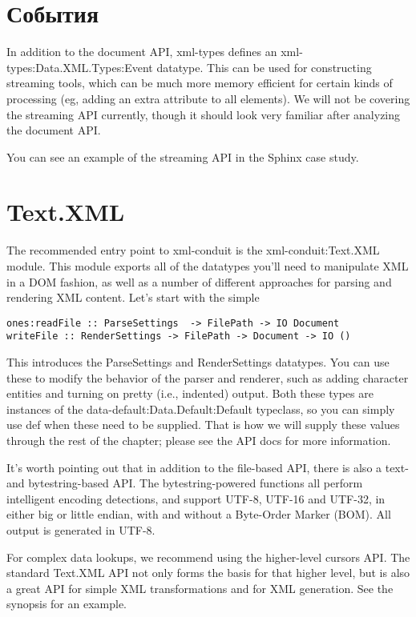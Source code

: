 \section{События} %

In addition to the document API, xml-types defines an xml-types:Data.XML.Types:Event datatype. This can be used for constructing streaming tools, which can be much more memory efficient for certain kinds of processing (eg, adding an extra attribute to all elements). We will not be covering the streaming API currently, though it should look very familiar after analyzing the document API.

\begin{remark}
You can see an example of the streaming API in the Sphinx case study.
\end{remark}

\section{Text.XML}

The recommended entry point to xml-conduit is the xml-conduit:Text.XML module. This module exports all of the datatypes you'll need to manipulate XML in a DOM fashion, as well as a number of different approaches for parsing and rendering XML content. Let's start with the simple

\begin{lstlisting}
ones:readFile :: ParseSettings  -> FilePath -> IO Document
writeFile :: RenderSettings -> FilePath -> Document -> IO ()
\end{lstlisting}

This introduces the ParseSettings and RenderSettings datatypes. You can use these to modify the behavior of the parser and renderer, such as adding character entities and turning on pretty (i.e., indented) output. Both these types are instances of the data-default:Data.Default:Default typeclass, so you can simply use def when these need to be supplied. That is how we will supply these values through the rest of the chapter; please see the API docs for more information.

It's worth pointing out that in addition to the file-based API, there is also a text- and bytestring-based API. The bytestring-powered functions all perform intelligent encoding detections, and support UTF-8, UTF-16 and UTF-32, in either big or little endian, with and without a Byte-Order Marker (BOM). All output is generated in UTF-8.

For complex data lookups, we recommend using the higher-level cursors API. The standard Text.XML API not only forms the basis for that higher level, but is also a great API for simple XML transformations and for XML generation. See the synopsis for an example.

